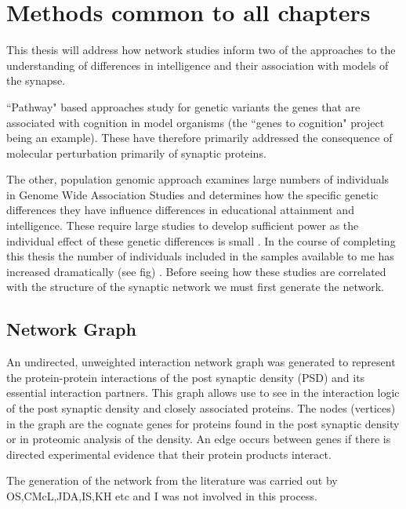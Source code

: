 \chapter{Methods common to all chapters}



This thesis will address how network studies inform two of the approaches to the understanding of differences in intelligence and their association with models of the synapse.

``Pathway" based approaches study for genetic variants the genes that are associated with cognition in model organisms \cite{deary2009genetic} (the ``genes to cognition" project being an example). These have therefore primarily addressed the consequence of molecular perturbation primarily of synaptic proteins. 

The other, population genomic approach examines large numbers of individuals in Genome Wide Association Studies and determines how the specific genetic differences they have influence differences in educational attainment and intelligence. These require large studies to develop sufficient power as the individual effect of these genetic differences is small \cite{plomin2015genetics}. In the course of completing this thesis the number of individuals included in the samples  available to me has increased dramatically (see fig) . Before seeing how these studies are correlated with the structure of the synaptic network we must first generate the network. 


\section{Network Graph}
\label{sec:network graph generation}

An undirected, unweighted interaction network graph was generated to represent the protein-protein interactions of the post synaptic density (PSD) and its essential interaction partners. This graph allows use to see in the interaction logic of the post synaptic density and closely associated proteins. The nodes (vertices) in the graph are the cognate genes for proteins found in the post synaptic density or in proteomic analysis of the density. An edge occurs between genes if there is directed experimental evidence that their protein products interact. 

The generation of the network from the literature was carried out by OS,CMcL,JDA,IS,KH etc and I was not involved in this process.

